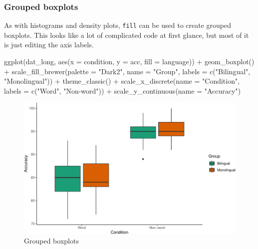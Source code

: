 \documentclass[
  english,
  doc,floatsintext]{apa6}
\newenvironment{Shaded}{\begin{snugshade}}{\end{snugshade}}
\newcommand{\AttributeTok}[1]{\textcolor[rgb]{0.77,0.63,0.00}{#1}}
\newcommand{\FunctionTok}[1]{\textcolor[rgb]{0.00,0.00,0.00}{#1}}
\newcommand{\NormalTok}[1]{#1}
\newcommand{\SpecialCharTok}[1]{\textcolor[rgb]{0.00,0.00,0.00}{#1}}
\newcommand{\StringTok}[1]{\textcolor[rgb]{0.31,0.60,0.02}{#1}}
\begin{document}
\hypertarget{grouped-boxplots}{%
\subsubsection{Grouped boxplots}\label{grouped-boxplots}}

As with histograms and density plots, \texttt{fill} can be used to create grouped boxplots. This looks like a lot of complicated code at first glance, but most of it is just editing the axis labels.

\begin{Shaded}
\begin{Highlighting}[]
\FunctionTok{ggplot}\NormalTok{(dat\_long, }\FunctionTok{aes}\NormalTok{(}\AttributeTok{x =}\NormalTok{ condition, }\AttributeTok{y =}\NormalTok{ acc, }\AttributeTok{fill =}\NormalTok{ language)) }\SpecialCharTok{+}
  \FunctionTok{geom\_boxplot}\NormalTok{() }\SpecialCharTok{+}
  \FunctionTok{scale\_fill\_brewer}\NormalTok{(}\AttributeTok{palette =} \StringTok{"Dark2"}\NormalTok{,}
                    \AttributeTok{name =} \StringTok{"Group"}\NormalTok{,}
                    \AttributeTok{labels =} \FunctionTok{c}\NormalTok{(}\StringTok{"Bilingual"}\NormalTok{, }\StringTok{"Monolingual"}\NormalTok{)) }\SpecialCharTok{+}
  \FunctionTok{theme\_classic}\NormalTok{() }\SpecialCharTok{+}
  \FunctionTok{scale\_x\_discrete}\NormalTok{(}\AttributeTok{name =} \StringTok{"Condition"}\NormalTok{,}
                   \AttributeTok{labels =} \FunctionTok{c}\NormalTok{(}\StringTok{"Word"}\NormalTok{, }\StringTok{"Non{-}word"}\NormalTok{)) }\SpecialCharTok{+}
  \FunctionTok{scale\_y\_continuous}\NormalTok{(}\AttributeTok{name =} \StringTok{"Accuracy"}\NormalTok{)}
\end{Highlighting}
\end{Shaded}

\begin{figure}

{\centering \includegraphics[width=1\linewidth]{images/boxplot3-1} 

}

\caption{Grouped boxplots}\label{fig:boxplot3}
\end{figure}
\end{document}
